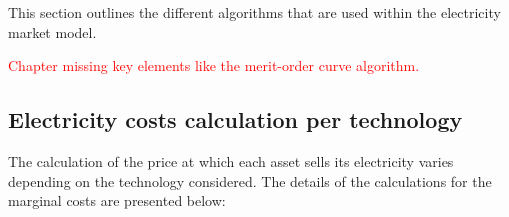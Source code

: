 
This section outlines the different algorithms that are used within the electricity market model.

\textcolor{red}{Chapter missing key elements like the merit-order curve algorithm.}

\subsection{Electricity costs calculation per technology}


The calculation of the price at which each asset sells its electricity varies depending on the technology considered. The details of the calculations for the marginal costs are presented below:

